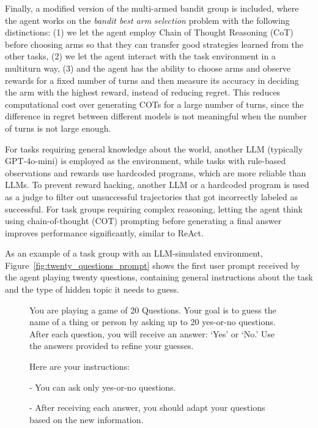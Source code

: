 \documentclass[manuscript,review]{acmart}
\begin{document}
{{Finally, a modified version of the
multi-armed bandit group is included, where the agent works on the \textit{bandit best
arm selection} problem with the following distinctions: (1) we let the agent employ
Chain of Thought Reasoning (CoT) before choosing arms so that they can transfer good
strategies learned from the other tasks, (2) we let the agent interact with the task
environment in a multiturn way, (3) and the agent has the ability to choose arms and
observe rewards for a fixed number of turns and then measure its accuracy in deciding
the arm with the highest reward, instead of reducing regret. This reduces computational
cost over generating COTs for a large number of turns, since the difference in regret between
different models is not meaningful when the number of turns is not large enough.

For tasks requiring general knowledge about the world, another LLM (typically GPT-4o-mini)
is employed as the environment, while tasks with rule-based observations and rewards use
hardcoded programs, which are more reliable than
LLMs\cite{deepseekai2025deepseekr1incentivizingreasoningcapability}. To prevent reward
hacking, another LLM or a hardcoded program is used as a judge to filter out unsuccessful
trajectories that got incorrectly labeled as successful. For task groups requiring complex
reasoning, letting the agent think using chain-of-thought (COT) prompting\cite{wei2022chain}
before generating a final answer improves performance significantly, similar to
ReAct\cite{yao2023reactsynergizingreasoningacting}.

As an example of a task group with an LLM-simulated environment,
Figure~\ref{fig:twenty_questions_prompt} shows the first user prompt received by the
agent playing twenty questions, containing general instructions about the task and the
type of hidden topic it needs to guess.

\begin{figure}[H]
\begin{tcolorbox}[colback=gray!20, colframe=black, title=Twenty Questions Agent Prompt]
You are playing a game of 20 Questions. Your goal is to guess the name of a thing or
person by asking up to 20 yes-or-no questions. After each question, you will receive an
answer: `Yes' or `No.' Use the answers provided to refine your guesses.

Here are your instructions:

- You can ask only yes-or-no questions.

- After receiving each answer, you should adapt your questions based on the new information.


\end{tcolorbox}
\end{figure}}}
\end{document}
